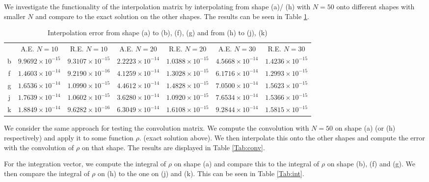 \documentclass[11pt, a4paper]{article}
\theoremstyle{definition}
\begin{document}
We investigate the functionality of the interpolation matrix by interpolating from shape (a)/ (h) with $N = 50$ onto different shapes with smaller $N$ and compare to the exact solution on the other shapes. The results can be seen in Table \ref{Tab:Interp}.

\begin{table}
	\caption{Interpolation error from shape (a) to (b), (f), (g) and from (h) to (j), (k)}
	\begin{tabular}{ ||c| c| c| c| c |c|c|| }
		\hline
		\hline
		& A.E. $N =10$ & R.E. $N =10$ &A.E. $N =20$ & R.E. $N =20$ &A.E. $N =30$ & R.E. $N =30$ \\ 
		b& $  9.9692\times 10^{- 15}$ & $ 9.3107\times 10^{-15 }$ & $2.2223 \times 10^{- 14}$ & $1.0388 \times 10^{-15 }$ &$ 4.5668 \times 10^{-14 }$ & $1.4236 \times 10^{- 15}$ \\
	    f& $ 1.4603\times 10^{-14}$ & $9.2190 \times 10^{- 16}$ & $4.1259 \times 10^{-14 }$ & $1.3028 \times 10^{-15 }$ &$6.1716 \times 10^{-14 }$ & $1.2993\times 10^{-15 }$ \\
		g& $ 1.6536\times 10^{-14 }$ & $1.0990 \times 10^{-15 }$ & $4.4612 \times 10^{-14 }$ & $ 1.4828\times 10^{-15 }$ &$ 7.0500\times 10^{-14 }$ & $1.5623 \times 10^{- 15}$ \\
		\hline
		j& $1.7639 \times 10^{-14 }$ & $1.0602 \times 10^{- 15}$ & $3.6280 \times 10^{- 14}$ & $ 1.0920\times 10^{- 15}$ &$7.6534 \times 10^{-14 }$ & $ 1.5366\times 10^{- 15}$ \\
		k& $ 1.8849\times 10^{-14 }$ & $9.6282 \times 10^{- 16}$ & $ 6.3049\times 10^{-14 }$ & $ 1.6108\times 10^{- 15}$ &$ 9.2844\times 10^{-14 }$ & $1.5815 \times 10^{- 15}$ \\
		\hline
	\end{tabular}
	\label{Tab:Interp}
\end{table}

We consider the same approach for testing the convolution matrix. We compute the convolution with $N = 50$ on shape (a) (or (h) respectively) and apply it to some function $\rho$. (exact solution above). We then interpolate this onto the other shapes and compute the error with the convolution of $\rho$ on that shape. The results are displayed in Table \ref{Tab:conv}.

For the integration vector, we compute the integral of $\rho$ on shape (a) and compare this to the integral of $\rho$ on shape (b), (f) and (g). We then compare the integral of $\rho$ on (h) to the one on (j) and (k). This can be seen in Table \ref{Tab:int}.
\end{document}
